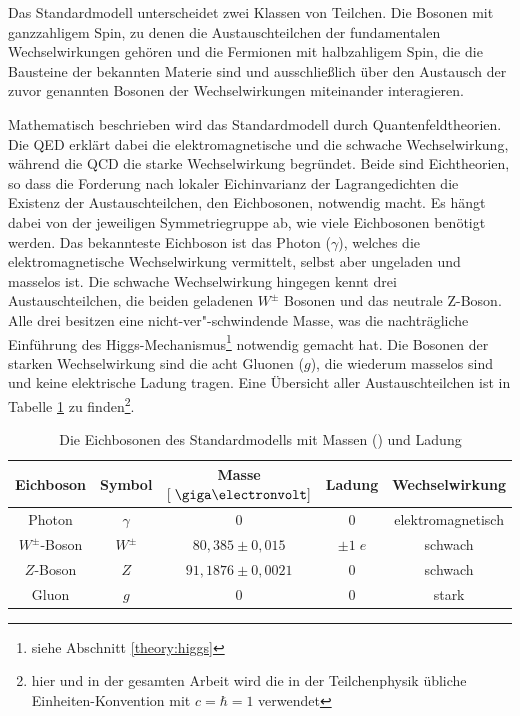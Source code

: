 Das Standardmodell unterscheidet zwei Klassen von Teilchen. Die Bosonen mit
ganzzahligem Spin, zu denen die Austauschteilchen der fundamentalen
Wechselwirkungen gehören und die Fermionen mit halbzahligem Spin, die die
Bausteine der bekannten Materie sind und ausschließlich über den Austausch der
zuvor genannten Bosonen der Wechselwirkungen miteinander interagieren.

Mathematisch beschrieben wird das Standardmodell durch Quantenfeldtheorien. Die
\ac{QED} erklärt dabei die elektromagnetische und die schwache Wechselwirkung,
während die \ac{QCD} die starke Wechselwirkung begründet. Beide sind
Eichtheorien, so dass die Forderung nach lokaler Eichinvarianz der
Lagrangedichten die Existenz der Austauschteilchen, den Eichbosonen, notwendig
macht. Es hängt dabei von der jeweiligen Symmetriegruppe ab, wie viele
Eichbosonen benötigt werden. Das bekannteste Eichboson ist das Photon
($\gamma$), welches die elektromagnetische Wechselwirkung vermittelt, selbst
aber ungeladen und masselos ist. Die schwache Wechselwirkung hingegen kennt
drei Austauschteilchen, die beiden geladenen $W^\pm$ Bosonen und das neutrale
Z-Boson. Alle drei besitzen eine nicht-ver"-schwindende Masse, was die
nachträgliche Einführung des Higgs-Mechanismus\footnote{siehe Abschnitt
\ref{theory:higgs}} notwendig gemacht hat. Die Bosonen der starken
Wechselwirkung sind die acht Gluonen ($g$), die wiederum masselos sind und
keine elektrische Ladung tragen. Eine Übersicht aller Austauschteilchen ist in
Tabelle \ref{tab:bosons} zu finden\footnote{hier und in der gesamten Arbeit
wird die in der Teilchenphysik übliche Einheiten-Konvention mit $c=\hbar=1$
verwendet}.

\begin{table}[h]
    \centering
    \begin{tabular}{|c|c|c|c|c|}
        \hline
        \bf{Eichboson} & \bf{Symbol} & \bf{Masse} $[\GeV]$ & \bf{Ladung} &
        \bf{Wechselwirkung} \\
        \hline\hline
        Photon        & $\gamma$ & $0$         & $0$     & elektromagnetisch \\
        $W^\pm$-Boson & $W^\pm$  & $80,385 \pm 0,015$  & $\pm1\;e$ & schwach \\
        $Z$-Boson     & $Z$      & $91,1876 \pm 0,0021$& $0$       & schwach \\
        Gluon         & $g$      & $0$                 & $0$       & stark   \\
        \hline
    \end{tabular}
    \caption[Die Eichbosonen des Standardmodells]
        {Die Eichbosonen des Standardmodells mit Massen
        (\cite{PhysRevD.86.010001}) und Ladung}
    \label{tab:bosons}
\end{table}

